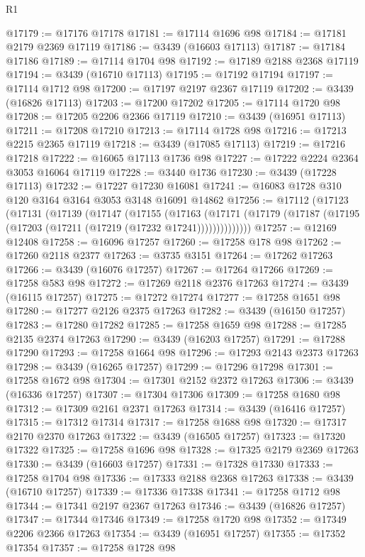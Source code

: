 \begin{lexlean}{R1}
\begin{coremodule}
@17179 := @17176 @17178
@17181 := @17114 @1696 @98
@17184 := @17181 @2179 @2369 @17119
@17186 := @3439 (@16603 @17113)
@17187 := @17184 @17186
@17189 := @17114 @1704 @98
@17192 := @17189 @2188 @2368 @17119
@17194 := @3439 (@16710 @17113)
@17195 := @17192 @17194
@17197 := @17114 @1712 @98
@17200 := @17197 @2197 @2367 @17119
@17202 := @3439 (@16826 @17113)
@17203 := @17200 @17202
@17205 := @17114 @1720 @98
@17208 := @17205 @2206 @2366 @17119
@17210 := @3439 (@16951 @17113)
@17211 := @17208 @17210
@17213 := @17114 @1728 @98
@17216 := @17213 @2215 @2365 @17119
@17218 := @3439 (@17085 @17113)
@17219 := @17216 @17218
@17222 := @16065 @17113 @1736 @98
@17227 := @17222 @2224 @2364 @3053 @16064 @17119
@17228 := @3440 @1736
@17230 := @3439 (@17228 @17113)
@17232 := @17227 @17230 @16081
@17241 := @16083 @1728 @310 @120 @3164 @3164 @3053 @3148 @16091 @14862
@17256 := @17112
    (@17123
      (@17131
        (@17139
          (@17147
            (@17155
              (@17163
                (@17171 (@17179 (@17187 (@17195 (@17203 (@17211 (@17219 (@17232 @17241))))))))))))))
@17257 := @12169 @12408
@17258 := @16096 @17257
@17260 := @17258 @178 @98
@17262 := @17260 @2118 @2377
@17263 := @3735 @3151
@17264 := @17262 @17263
@17266 := @3439 (@16076 @17257)
@17267 := @17264 @17266
@17269 := @17258 @583 @98
@17272 := @17269 @2118 @2376 @17263
@17274 := @3439 (@16115 @17257)
@17275 := @17272 @17274
@17277 := @17258 @1651 @98
@17280 := @17277 @2126 @2375 @17263
@17282 := @3439 (@16150 @17257)
@17283 := @17280 @17282
@17285 := @17258 @1659 @98
@17288 := @17285 @2135 @2374 @17263
@17290 := @3439 (@16203 @17257)
@17291 := @17288 @17290
@17293 := @17258 @1664 @98
@17296 := @17293 @2143 @2373 @17263
@17298 := @3439 (@16265 @17257)
@17299 := @17296 @17298
@17301 := @17258 @1672 @98
@17304 := @17301 @2152 @2372 @17263
@17306 := @3439 (@16336 @17257)
@17307 := @17304 @17306
@17309 := @17258 @1680 @98
@17312 := @17309 @2161 @2371 @17263
@17314 := @3439 (@16416 @17257)
@17315 := @17312 @17314
@17317 := @17258 @1688 @98
@17320 := @17317 @2170 @2370 @17263
@17322 := @3439 (@16505 @17257)
@17323 := @17320 @17322
@17325 := @17258 @1696 @98
@17328 := @17325 @2179 @2369 @17263
@17330 := @3439 (@16603 @17257)
@17331 := @17328 @17330
@17333 := @17258 @1704 @98
@17336 := @17333 @2188 @2368 @17263
@17338 := @3439 (@16710 @17257)
@17339 := @17336 @17338
@17341 := @17258 @1712 @98
@17344 := @17341 @2197 @2367 @17263
@17346 := @3439 (@16826 @17257)
@17347 := @17344 @17346
@17349 := @17258 @1720 @98
@17352 := @17349 @2206 @2366 @17263
@17354 := @3439 (@16951 @17257)
@17355 := @17352 @17354
@17357 := @17258 @1728 @98

\end{coremodule}
\end{lexlean}
